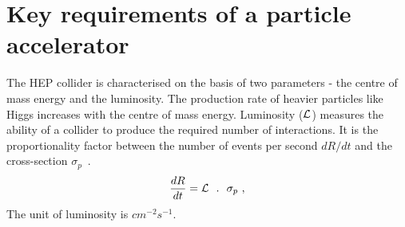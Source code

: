 \section{Key requirements of a particle accelerator} %
\label{sub:few_key_requirements}

The HEP collider is characterised on the basis of two parameters - the centre of mass energy and the luminosity. 
The production rate of heavier particles like Higgs increases with the centre of mass energy. 
Luminosity ({$\mathcal{L}$}) measures the ability of a collider to produce the required number of interactions. It is the proportionality factor between the number of events per second $dR/dt$ and the cross-section $\sigma_p$~\cite{Muratori2006}.
\begin{equation}
	\frac{dR}{dt} = \mathcal{L} ~~.~~ \sigma_p~,
\end{equation}
The unit of luminosity is $cm^{-2}s^{-1}$.

